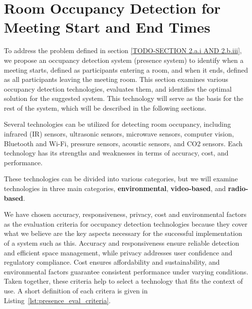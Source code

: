 \chapter{\label{sec:presence_intro}Room Occupancy Detection for Meeting Start and End Times}

To address the problem defined in section \ref{TODO-SECTION 2.a.i AND 2.b.iii}, we propose an occupancy detection system (presence system) to identify when a meeting starts, defined as participants entering a room, and when it ends, defined as all participants leaving the meeting room.
This section examines various occupancy detection technologies, evaluates them, and identifies the optimal solution for the suggested system.
This technology will serve as the basis for the rest of the system, which will be described in the following sections.

Several technologies can be utilized for detecting room occupancy, including infrared (IR) sensors\cite{woodward-2021}\cite{dodierBuildingOccupancyDetection2006}\cite{OccupancySensorMotion}, ultrasonic sensors\cite{woodward-2021}\cite{dodierBuildingOccupancyDetection2006}\cite{OccupancySensorMotion}, microwave sensors\cite{woodward-2021}, computer vision\cite{co2sensor}\cite{longoAccurateOccupancyEstimation2019}\cite{OccupancySensorMotion}, Bluetooth and Wi-Fi\cite{teissedre-2019,longoAccurateOccupancyEstimation2019}, pressure sensors\cite{OccupancySensorMotion}, acoustic sensors\cite{OccupancySensorMotion}, and CO2 sensors\cite{co2sensor}\cite{longoAccurateOccupancyEstimation2019}\cite{jinSensingProxyOccupancy2015}.\cite{faragherLocationFingerprintingBluetooth2015}
Each technology has its strengths and weaknesses in terms of accuracy, cost, and performance.

These technologies can be divided into various categories, but we will examine technologies in three main categories, \textbf{environmental}, \textbf{video-based}, and \textbf{radio-based}.

We have chosen accuracy, responsiveness, privacy, cost and environmental factors as the evaluation criteria for occupancy detection technologies because they cover what we believe are the key aspects necessary for the successful implementation of a system such as this.
Accuracy and responsiveness ensure reliable detection and efficient space management, while privacy addresses user confidence and regulatory compliance.
Cost ensures affordability and sustainability, and environmental factors guarantee consistent performance under varying conditions.
Taken together, these criteria help to select a technology that fits the context of use.
A short definition of each critera is given in Listing~\ref{lst:presence_eval_criteria}.

